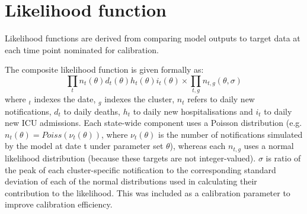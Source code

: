 \section{Likelihood function}

Likelihood functions are derived from comparing model outputs to target data at each time point nominated for calibration.

The composite likelihood function is given formally as:
\[\prod_{t}{n_{t}(\theta)d_{t}(\theta)h_{t}(\theta)i_{t}(\theta)} \times \prod_{t,g}{n_{t,g}(\theta,\sigma)}\]
where \(_{t}\) indexes the date, \(_{g}\) indexes the cluster, \(n_{t}\) refers to daily new notifications, \(d_{t}\) to daily deaths, \(h_{t}\) to daily new hospitalisations and \(i_{t}\) to daily new ICU admissions. Each state-wide component uses a Poisson distribution (e.g. \(n_{t}(\theta)=Poiss(\nu_{t}(\theta))\), where \(\nu_{t}(\theta)\) is the number of notifications simulated by the model at date t under parameter set \(\theta\)), whereas each \(n_{t,g}\) uses a normal likelihood distribution (because these targets are not integer-valued). \(\sigma\) is ratio of the peak of each cluster-specific notification to the corresponding standard deviation of each of the normal distributions used in calculating their contribution to the likelihood. This was included as a calibration parameter to improve calibration efficiency.